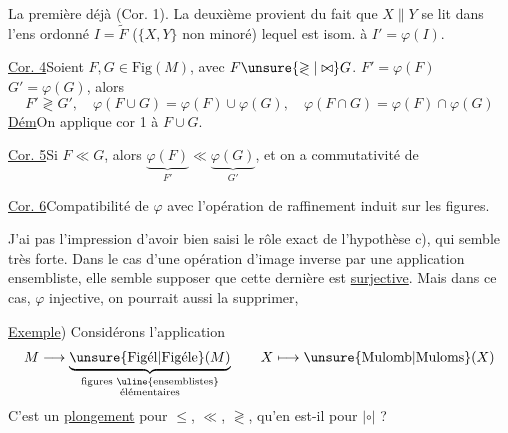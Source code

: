 La première\inserted{$\unsure{*}$}   déjà  (Cor. 1). La deuxième provient du fait que $X\parallel Y$ se lit dans l'ens ordonné $I=\widetilde F$ ($\{X,Y\}$ non minoré) lequel est isom. à $I'=\varphi(I)$.

\uline{Cor. 4}\quad Soient $F,G\in\mathrm{Fig}(M)$, avec $F\unsure{\gtrless|\bowtie}G$.   $F'=\varphi(F)$  $G'=\varphi(G)$, alors
\[
F'\gtrless G',\quad\varphi(F\cup G)=\varphi(F)\cup\varphi(G),\quad\varphi(F\cap G)=\varphi(F)\cap\varphi(G)
\]
\uline{Dém}\quad On applique cor 1 à $F\cup G$.

\uline{Cor. 5}\quad Si $F\ll G$, alors $\underbrace{\varphi(F)}_{F'}\ll\underbrace{\varphi(G)}_{G'}$, et on a commutativité de

\uline{Cor. 6}\quad Compatibilité de $\varphi$ avec l'opération de raffinement induit sur les figures.

J'ai pas l'impression d'avoir bien saisi le rôle exact de l'hypothèse c), qui semble très forte. Dans le cas d'une opération d'image inverse par une application ensembliste, elle semble supposer que cette dernière est \uline{surjective}. Mais dans ce cas, $\varphi$   injective, on pourrait aussi la supprimer, 


\uline{Exemple}) Considérons l'application
\[
M\longrightarrow\underbrace{\unsure{\mathrm{Fig\acute{e}l}|\mathrm{Fig\acute{e}le}}(M)}_{\substack{\text{figures \uline{ensemblistes}}\\\text{élémentaires}}}\qquad X\longmapsto\unsure{\mathrm{Mulomb}|\mathrm{Muloms}}(X)
\]
C'est un \uline{plongement} pour $\leq$, $\ll$, $\gtrless$, qu'en est-il pour $\mathrel{|\circ|}$ ?

